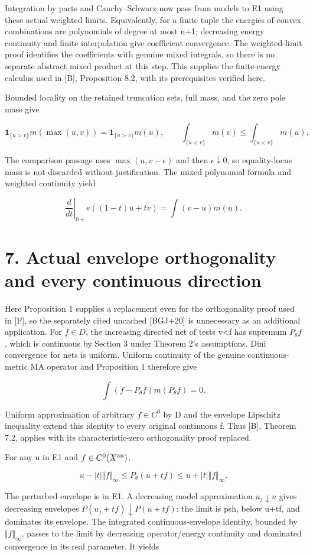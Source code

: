 \documentclass[11pt]{article}
\begin{document}
Integration by parts and Cauchy--Schwarz now pass from models to E1 using these actual weighted limits. Equivalently, for a finite tuple the energies of convex combinations are polynomials of degree at most n+1; decreasing energy continuity and finite interpolation give coefficient convergence. The weighted-limit proof identifies the coefficients with genuine mixed integrals, so there is no separate abstract mixed product at this step. This supplies the finite-energy calculus used in [B], Proposition 8.2, with its prerequisites verified here.

Bounded locality on the retained truncation sets, full mass, and the zero pole mass give

\[
\mathbf1_{\{u>v\}}m(\max(u,v))=\mathbf1_{\{u>v\}}m(u),
\qquad\int_{\{u<v\}}m(v)\leq\int_{\{u<v\}}m(u).
\]

The comparison passage uses \(\max(u,v-\epsilon)\) and then \(\epsilon\downarrow0\), so equality-locus mass is not discarded without justification. The mixed polynomial formula and weighted continuity yield

\[
\left.\frac{d}{dt}\right|_{0+}e((1-t)u+tv)=\int(v-u)m(u).
\]

\section*{7. Actual envelope orthogonality and every continuous direction}

Here Proposition 1 supplies a replacement even for the orthogonality proof used in [F], so the separately cited uncached [BGJ+20] is unnecessary as an additional application. For \(f\in D\), the increasing directed net of tests v<f has supremum \(P_\theta f\), which is continuous by Section 3 under Theorem 2's assumptions. Dini convergence for nets is uniform. Uniform continuity of the genuine continuous-metric MA operator and Proposition 1 therefore give

\[
\int(f-P_\theta f)m(P_\theta f)=0.
\]

Uniform approximation of arbitrary \(f\in C^0\) by D and the envelope Lipschitz inequality extend this identity to every original continuous f. Thus [B], Theorem 7.2, applies with its characteristic-zero orthogonality proof replaced.

For any u in E1 and \(f\in C^0(X^{\rm an})\),

\[
u-|t|\Vert f\Vert_\infty\leq P_\theta(u+tf)
\leq u+|t|\Vert f\Vert_\infty.
\]

The perturbed envelope is in E1. A decreasing model approximation \(u_j\downarrow u\) gives decreasing envelopes \(P(u_j+tf)\downarrow P(u+tf)\): the limit is psh, below u+tf, and dominates its envelope. The integrated continuous-envelope identity, bounded by \(\Vert f\Vert_\infty\), passes to the limit by decreasing operator/energy continuity and dominated convergence in its real parameter. It yields
\end{document}
